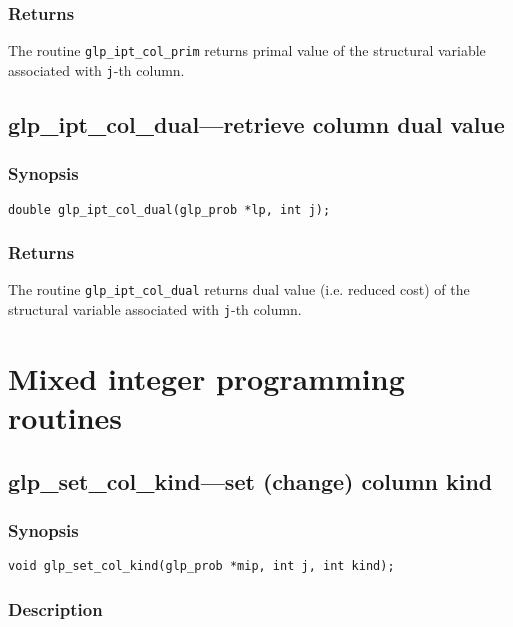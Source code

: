 \subsubsection*{Returns}

The routine \verb|glp_ipt_col_prim| returns primal value of the
structural variable associated with \verb|j|-th column.

\subsection{glp\_ipt\_col\_dual---retrieve column dual value}

\subsubsection*{Synopsis}

\begin{verbatim}
double glp_ipt_col_dual(glp_prob *lp, int j);
\end{verbatim}

\subsubsection*{Returns}

The routine \verb|glp_ipt_col_dual| returns dual value (i.e. reduced
cost) of the structural variable associated with \verb|j|-th column.


\newpage

\section{Mixed integer programming routines}

\subsection{glp\_set\_col\_kind---set (change) column kind}

\subsubsection*{Synopsis}

\begin{verbatim}
void glp_set_col_kind(glp_prob *mip, int j, int kind);
\end{verbatim}

\subsubsection*{Description}

